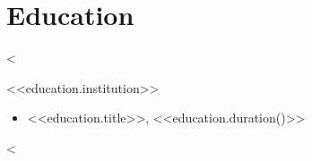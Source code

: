 \section{Education}
<%
\begin{description}
    \item [<<education.institution>>]
\end{description}
\begin{itemize}
    \item <<education.title>>, <<education.duration()>>
\end{itemize}
<%